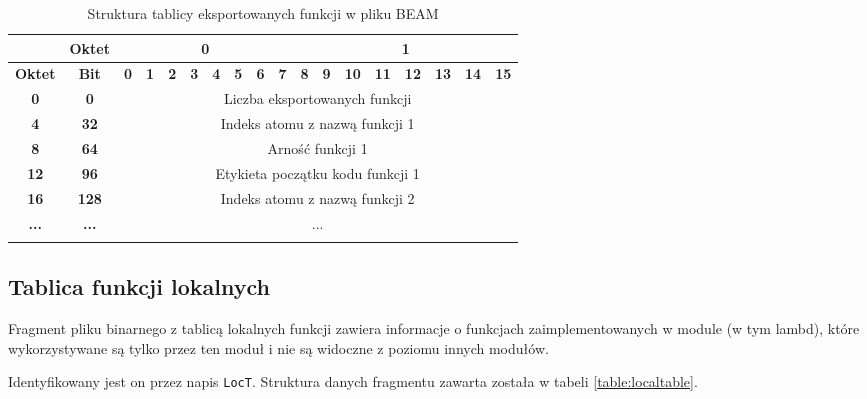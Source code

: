 \begin{longtable}{|c|c|c|c|c|c|c|c|c|c|c|c|c|c|c|c|c|c|}
\hline
         & \textbf{Oktet} & \multicolumn{8}{|c|}{\textbf{0}} & \multicolumn{8}{|c|}{\textbf{1}} \\
\hline
\textbf{Oktet} & \textbf{Bit} & \textbf{0} & \textbf{1} & \textbf{2} & \textbf{3} & \textbf{4} & \textbf{5} & \textbf{6} & \textbf{7} & \textbf{8} & \textbf{9} & \textbf{10} & \textbf{11} & \textbf{12} & \textbf{13} & \textbf{14} & \textbf{15}\\
\hline
\textbf{0} & \textbf{0} & \multicolumn{16}{|c|}{Liczba eksportowanych funkcji} \\[3ex]
\hline
\textbf{4} & \textbf{32} & \multicolumn{16}{|c|}{Indeks atomu z nazwą funkcji 1}\\[3ex]
\hline
\textbf{8} & \textbf{64} & \multicolumn{16}{|c|}{Arność funkcji 1} \\[3ex]
\hline
\textbf{12} & \textbf{96} & \multicolumn{16}{|c|}{Etykieta początku kodu funkcji 1}\\[3ex]
\hline
\textbf{16} & \textbf{128} & \multicolumn{16}{|c|}{Indeks atomu z nazwą funkcji 2}\\[3ex]
\hline
\textbf{...} & \textbf{...} & \multicolumn{16}{|c|}{...}  \\[3ex]
\hline
\caption{Struktura tablicy eksportowanych funkcji w pliku BEAM}
\label{table:exporttable} \\
\end{longtable}

\subsection{Tablica funkcji lokalnych}
Fragment pliku binarnego z tablicą lokalnych funkcji zawiera informacje o funkcjach zaimplementowanych w module (w tym lambd), które wykorzystywane są tylko przez ten moduł i nie są widoczne z poziomu innych modułów.

Identyfikowany jest on przez napis \texttt{LocT}. Struktura danych fragmentu zawarta została w tabeli \ref{table:localtable}.

